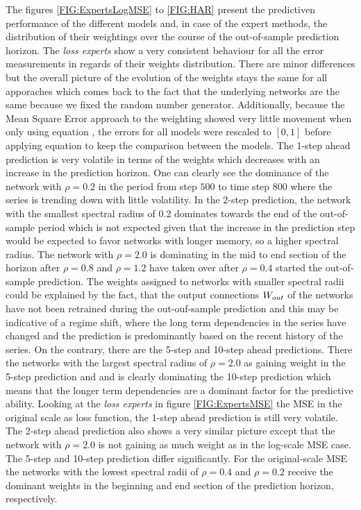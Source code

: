 The figures \ref{FIG:ExpertsLogMSE} to \ref{FIG:HAR} present the predictiven performance of the different models and, in case of the expert methods, the distribution of their weightings over the course of the out-of-sample prediction horizon.
The \textit{loss experts} show a very consistent behaviour for all the error measurements in regards of their weights distribution. There are minor differences but the overall picture of the evolution of the weights stays the same for all apporaches which comes back to the fact that the underlying networks are the same because we fixed the random number generator. Additionally, because the Mean Square Error approach to the weighting showed very little movement when only using equation , the errors for all models were rescaled to $[0,1]$ before applying equation  to keep the comparison between the models.
The 1-step ahead prediction is very volatile in terms of the weights which decreases with an increase in the prediction horizon. One can clearly see the dominance of the network with $\rho= 0.2$ in the period from step $500$ to time step $800$ where the series is trending down with little volatility. In the 2-step prediction, the network with the smallest spectral radius of $0.2$ dominates towards the end of the out-of-sample period which is not expected given that the increase in the prediction step would be expected to favor networks with longer memory, so a higher spectral radius. The network with $\rho = 2.0$ is dominating in the mid to end section of the horizon after $\rho = 0.8$ and $\rho = 1.2$ have taken over after $\rho = 0.4$ started the out-of-sample prediction. The weights assigned to networks with smaller spectral radii could be explained by the fact, that the output connections $W_{out}$ of the networks have not been retrained during the out-ouf-sample prediction and this may be indicative of a regime shift, where the long term dependencies in the series have changed and the prediction is predominantly based on the recent history of the series. On the contrary, there are the 5-step and 10-step ahead predictions. There the networks with the largest spectral radius of $\rho = 2.0$ as gaining weight in the 5-step prediction and and is clearly dominating the 10-step prediction which means that the longer term dependencies are a dominant factor for the predictive ability. Looking at the \textit{loss experts} in figure \ref{FIG:ExpertsMSE} the MSE in the original scale as loss function, the 1-step ahead prediction is still very volatile. The 2-step ahead prediction also shows a very similar picture except that the network with $\rho = 2.0$ is not gaining as much weight as in the log-scale MSE case. The 5-step and 10-step prediction differ significantly. For the original-scale MSE the networks with the lowest spectral radii of $\rho = 0.4$ and $\rho = 0.2$ receive the dominant weights in the beginning and end section of the prediction horizon, respectively.
